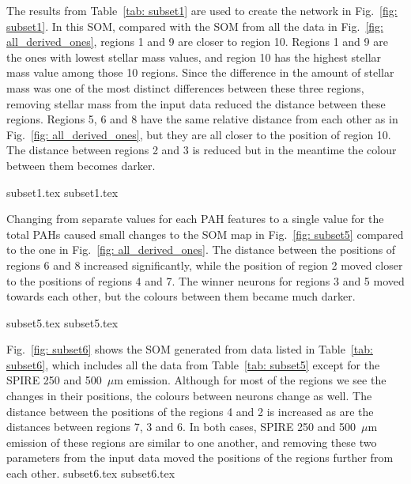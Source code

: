             The results from Table~\ref{tab: subset1} are used to create the network in Fig.~\ref{fig: subset1}. 
            In this SOM, compared with the SOM from all the data in Fig.~\ref{fig: all_derived_ones}, regions 1 and 9 are closer to region 10. 
            Regions 1 and 9 are the ones with lowest stellar mass values, and region 10 has the highest stellar mass value among those 10 regions. 
            Since the difference in the amount of stellar mass was one of the most distinct differences between these three regions, removing stellar mass from the input data reduced the distance between these regions.
            Regions 5, 6 and 8 have the same relative distance from each other as in Fig.~\ref{fig: all_derived_ones}, but they are all closer to the position of region 10.
            The distance between regions 2 and 3 is reduced but in the meantime the colour between them becomes darker.

            {subset1.tex}
            {subset1.tex}

            Changing from separate values for each PAH features to a single value for the total PAHs caused small changes to the SOM map in Fig.~\ref{fig: subset5} compared to the one in Fig.~\ref{fig: all_derived_ones}. 
            The distance between the positions of regions 6 and 8 increased significantly, while the position of region 2 moved closer to the positions of regions 4 and 7.
            The winner neurons for regions 3 and 5 moved towards each other, but the colours between them became much darker. 

            {subset5.tex}
            {subset5.tex}

            Fig.~\ref{fig: subset6} shows the SOM generated from data listed in Table~\ref{tab: subset6}, which includes all the data from Table~\ref{tab: subset5} except for the SPIRE 250 and 500~$\mu$m emission.
            Although for most of the regions we see the changes in their positions, the colours between neurons change as well. 
            The distance between the positions of the regions 4 and 2 is increased as are the
            distances between regions 7, 3 and 6.
            In both cases, SPIRE 250 and 500~$\mu$m emission of these regions are similar to one another, and removing these two parameters from the input data moved the positions of the regions further from each other. 
            {subset6.tex}
            {subset6.tex}
            
